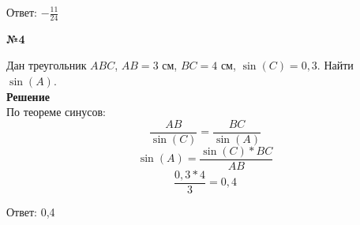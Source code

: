     Ответ: $-\frac{11}{24}$

    \begin{center}
        \textbf{№4}
    \end{center}

    Дан треугольник $ABC$, $AB = 3$ см, $BC = 4$ см, $\sin(C) = 0,3$.
    Найти $\sin(A)$.\\

    \textbf{Решение}\\

    По теореме синусов:
    \[
        \frac{AB}{\sin(C)} = \frac{BC}{\sin(A)}
    \]
    \[ \sin(A) = \frac{\sin(C)*BC}{AB} \]
    \[
        \frac{0,3 * 4}{3} = 0,4
    \]

    Ответ: 0,4




